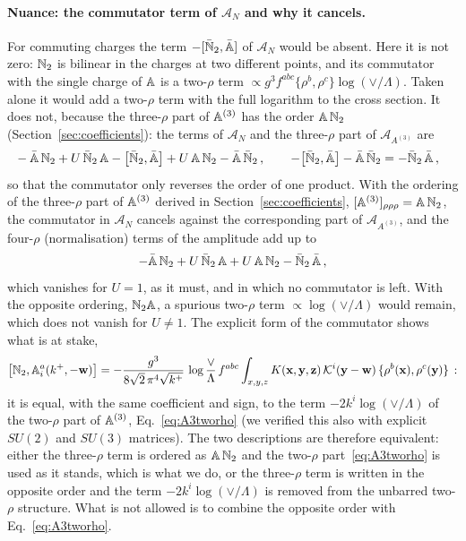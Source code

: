 \paragraph{Nuance: the commutator term of $\mathcal A_N$ and why it cancels.} For commuting charges the term $-[\bar{\mathbb{N}}_2,\bar{\mathbb{A}}]$ of $\mathcal A_N$ would be absent. Here it is not zero: $\mathbb{N}_2$ is bilinear in the charges at two different points, and its commutator with the single charge of $\mathbb{A}$ is a two-$\rho$ term $\propto g^3f^{abc}\{\rho^b,\rho^c\}\log(\vee/\Lambda)$. Taken alone it would add a two-$\rho$ term with the full logarithm to the cross section. It does not, because the three-$\rho$ part of $\mathbb{A}^{(3)}$ has the order $\mathbb{A}\,\mathbb{N}_2$ (Section~\ref{sec:coefficients}): the terms of $\mathcal A_N$ and the three-$\rho$ part of $\mathcal A_{A^{(3)}}$ are
\begin{align}\label{eq:Nterms_steps}
&-\bar{\mathbb{A}}\,\mathbb{N}_2+U\,\bar{\mathbb{N}}_2\,\mathbb{A}-\big[\bar{\mathbb{N}}_2,\bar{\mathbb{A}}\big]+U\,\mathbb{A}\,\mathbb{N}_2-\bar{\mathbb{A}}\,\bar{\mathbb{N}}_2\,,\qquad
-\big[\bar{\mathbb{N}}_2,\bar{\mathbb{A}}\big]-\bar{\mathbb{A}}\,\bar{\mathbb{N}}_2=-\bar{\mathbb{N}}_2\,\bar{\mathbb{A}}\,,
\end{align}
so that the commutator only reverses the order of one product. With the ordering of the three-$\rho$ part of $\mathbb{A}^{(3)}$ derived in Section~\ref{sec:coefficients}, $[\mathbb{A}^{(3)}]_{\rho\rho\rho}=\mathbb{A}\,\mathbb{N}_2$, the commutator in $\mathcal A_N$ cancels against the corresponding part of $\mathcal A_{A^{(3)}}$, and the four-$\rho$ (normalisation) terms of the amplitude add up to
\begin{align}\label{eq:Nterms}
-\bar{\mathbb{A}}\,\mathbb{N}_2+U\,\bar{\mathbb{N}}_2\,\mathbb{A}+U\,\mathbb{A}\,\mathbb{N}_2-\bar{\mathbb{N}}_2\,\bar{\mathbb{A}}\,,
\end{align}
which vanishes for $U=1$, as it must, and in which no commutator is left. With the opposite ordering, $\mathbb{N}_2\mathbb{A}$, a spurious two-$\rho$ term $\propto\log(\vee/\Lambda)$ would remain, which does not vanish for $U\neq1$. The explicit form of the commutator shows what is at stake,
\begin{align}\label{eq:commN2A}
\big[\mathbb{N}_2,\mathbb{A}^a_i(k^+,-\mathbf{w})\big]=-\frac{g^3}{8\sqrt2\,\pi^4\sqrt{k^+}}\,\log\frac{\vee}{\Lambda}\,f^{abc}\int_{x,y,z}K(\mathbf{x},\mathbf{y},\mathbf{z})\,\mathcal{K}^i(\mathbf{y}-\mathbf{w})\,\{\rho^b(\mathbf{x}),\rho^c(\mathbf{y})\}\,:
\end{align}
it is equal, with the same coefficient and sign, to the term $-2k^i\log(\vee/\Lambda)$ of the two-$\rho$ part of $\mathbb{A}^{(3)}$, Eq.~\eqref{eq:A3tworho} (we verified this also with explicit $SU(2)$ and $SU(3)$ matrices). The two descriptions are therefore equivalent: either the three-$\rho$ term is ordered as $\mathbb{A}\,\mathbb{N}_2$ and the two-$\rho$ part~\eqref{eq:A3tworho} is used as it stands, which is what we do, or the three-$\rho$ term is written in the opposite order and the term $-2k^i\log(\vee/\Lambda)$ is removed from the unbarred two-$\rho$ structure. What is not allowed is to combine the opposite order with Eq.~\eqref{eq:A3tworho}.

